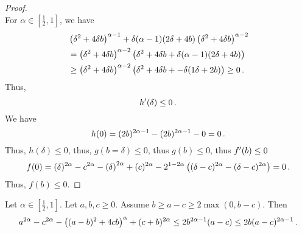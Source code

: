 \begin{proof}
\begin{equation*}
	\end{equation*}
	For $\alpha\in[\frac12,1]$, we have
	\begin{align*}
		&\left( \delta^2+4\delta b \right)^{\alpha-1}+\delta(\alpha-1)(2\delta+4b)\left( \delta^2+4\delta b \right)^{\alpha-2}
		\\&=
		\left( \delta^2+4\delta b \right)^{\alpha-2}\left( \delta^2+4\delta b+\delta (\alpha-1)(2\delta+4b) \right)
		\\& \geq 
		\left( \delta^2+4\delta b \right)^{\alpha-2}\left( \delta^2+4\delta b+ -\delta(1\delta+2b) \right)
		\geq0 
		\, .
	\end{align*}
	Thus, 
	\begin{equation*}
	h^\prime(\delta) \leq 0
	\, .
	\end{equation*}
	We have
	\begin{equation*}
		h(0) = (2b)^{2\alpha-1}- (2b)^{2\alpha-1} - 0 = 0
		\, .
	\end{equation*}
	Thus, $h(\delta)\leq 0$, thus, $g(b=\delta) \leq 0$, thus $g(b) \leq 0$, thus $f^\prime(b)\leq 0$
	\begin{equation*}
		f(0) = (\delta)^{2\alpha}-c^{2\alpha}-\left( \delta \right)^{2\alpha}+(c)^{2\alpha} -2^{1-2\alpha} \left( 	(\delta-c)^{2\alpha}  -  (\delta-c)^{2\alpha} \right) =0
		\, .
	\end{equation*}
	Thus, $f(b) \leq 0$.
\end{proof}
%
\begin{lemma}
	Let $\alpha\in[\frac12,1]$.
	Let $a,b,c\geq0$.
	Assume $b \geq a-c \geq 2\max(0, b-c)$.
	Then 
	\begin{equation*}
		a^{2\alpha}-c^{2\alpha}-\left( (a-b)^2+4cb \right)^{\alpha}+(c+b)^{2\alpha} 
		\leq 
		2 b^{2\alpha-1} (a-c)
		\leq
		2 b (a-c)^{2\alpha-1}
		\, .
	\end{equation*}
\end{lemma}
%
